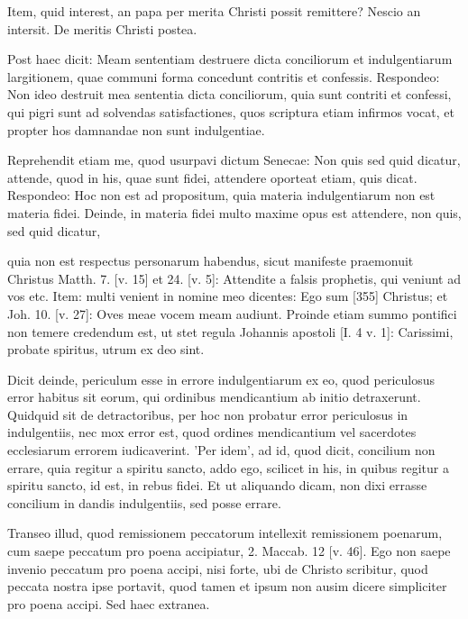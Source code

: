 Item, quid interest, an papa per merita Christi possit remittere? Nescio an intersit. De meritis Christi postea.

Post haec dicit: Meam sententiam destruere dicta conciliorum et indulgentiarum largitionem, quae communi forma concedunt contritis et confessis. Respondeo: Non ideo destruit mea sententia dicta conciliorum, quia sunt contriti et confessi, qui pigri sunt ad solvendas satisfactiones, quos scriptura etiam infirmos vocat, et propter hos damnandae non sunt indulgentiae.

Reprehendit etiam me, quod usurpavi dictum Senecae: Non quis sed quid dicatur, attende, quod in his, quae sunt fidei, attendere oporteat etiam, quis dicat. Respondeo: Hoc non est ad propositum, quia materia indulgentiarum non est materia fidei. Deinde, in materia fidei multo maxime opus est attendere, non quis, sed quid dicatur,

quia non est respectus personarum habendus, sicut manifeste praemonuit Christus Matth. 7. [v. 15] et 24. [v. 5]: Attendite a falsis prophetis, qui veniunt ad vos etc. Item: multi venient in nomine meo dicentes: Ego sum [355] Christus; et Joh. 10. [v. 27]: Oves meae vocem meam audiunt. Proinde etiam summo pontifici non temere credendum est, ut stet regula Johannis apostoli [I. 4 v. 1]: Carissimi, probate spiritus, utrum ex deo sint.

Dicit deinde, periculum esse in errore indulgentiarum ex eo, quod periculosus error habitus sit eorum, qui ordinibus mendicantium ab initio detraxerunt. Quidquid sit de detractoribus, per hoc non probatur error periculosus in indulgentiis, nec mox error est, quod ordines mendicantium vel sacerdotes ecclesiarum errorem iudicaverint. 'Per idem', ad id, quod dicit, concilium non errare, quia regitur a spiritu sancto, addo ego, scilicet in his, in quibus regitur a spiritu sancto, id est, in rebus fidei. Et ut aliquando dicam, non dixi errasse concilium in dandis indulgentiis, sed posse errare.

Transeo illud, quod remissionem peccatorum intellexit remissionem poenarum, cum saepe peccatum pro poena accipiatur, 2. Maccab. 12 [v. 46]. Ego non saepe invenio peccatum pro poena accipi, nisi forte, ubi de Christo scribitur, quod peccata nostra ipse portavit, quod tamen et ipsum non ausim dicere simpliciter pro poena accipi. Sed haec extranea.

